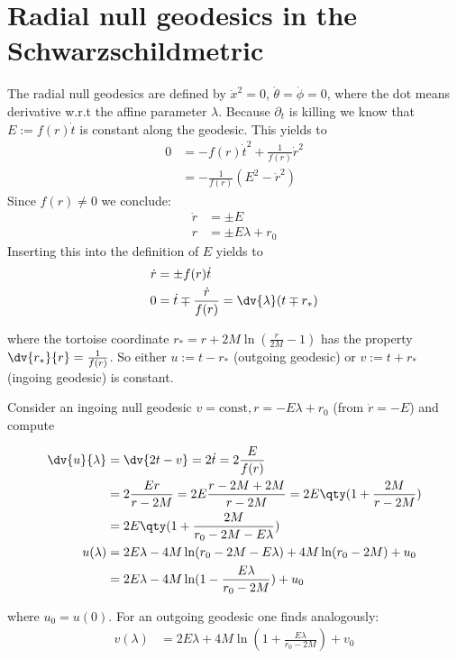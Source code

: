 \section{Radial null geodesics in the Schwarzschildmetric}
The radial null geodesics are defined by \(\dot{x}^2 = 0\), \(\dot{\theta} = \dot{\phi} = 0\), where the dot means derivative w.r.t the affine parameter \(\lambda\). Because \(\partial_t\) is killing we know that \(E := f(r)\dot{t}\) is constant along the geodesic. This yields to 
\begin{align}
0 &= -f(r)\dot{t}^2 + \frac{1}{f(r)}\dot{r}^2\\
  &= -\frac{1}{f(r)} (E^2 - \dot{r}^2)
\end{align}
Since \(f(r) \neq 0\) we conclude: 
\begin{align}
\dot{r} &= \pm E\\
r &= \pm E \lambda + r_0
\label{bh_geo_r_E}
\end{align}
Inserting this into the definition of \(E\) yields to
\begin{align}
\dot{r} &= \pm f(r) \dot{t}\\
0 &= \dot{t}\mp\frac{\dot{r}}{f(r)} = \dv{\lambda}(t \mp r_*)
\end{align}

where the tortoise coordinate \(r_* = r + 2M\ln(\frac{r}{2M} - 1)\) has the property \(\dv{r_*}{r} = \frac{1}{f(r)}\). So either \(u := t - r_*\) (outgoing geodesic) or \(v := t + r_*\) (ingoing geodesic) is constant.

Consider an ingoing null geodesic \(v = \mathrm{const}, r = -E\lambda + r_0\) (from \(\dot{r} = -E\)) and compute

\begin{align}
\dv{u}{\lambda} &=  \dv{2 t - v} = 2\dot{t} = 2\frac{E}{f(r)}\\
	&= 2\frac{Er}{r-2M} = 2E\frac{r-2M + 2M}{r-2M} = 2E\qty(1 + \frac{2M}{r-2M})\\
	&= 2E\qty(1 + \frac{2M}{r_0-2M - E\lambda})\\
u(\lambda) &= 2E\lambda - 4M\ln(r_0-2M-E\lambda) + 4M\ln(r_0-2M) + u_0\\
	&= 2E\lambda - 4M\ln(1 - \frac{E\lambda}{r_0-2M}) + u_0
\label{equ:bh_geo_in}
\end{align}

where \(u_0 = u(0)\). For an outgoing geodesic one finds analogously:
\begin{align}
v(\lambda) &= 2E\lambda + 4M\ln(1 + \frac{E\lambda}{r_0 - 2M}) + v_0
\label{equ:bh_geo_out}
\end{align}

